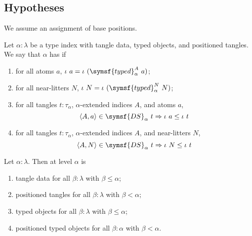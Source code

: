 \subsection{Hypotheses}

We assume an assignment of base positions.
\begin{definition}
    \label{def:PositionedTypedObjects}
    Let \( \alpha : \lambda \) be a type index with tangle data, typed objects, and positioned tangles.
    We say that \( \alpha \) has  if
    \begin{enumerate}
        \item for all atoms \( a \), \( \iota\ a = \iota\ (\symsf{typed}^A_\alpha\ a) \);
        \item for all near-litters \( N \), \( \iota\ N = \iota\ (\symsf{typed}^N_\alpha\ N) \);
        \item for all tangles \( t : \tau_\alpha \), \( \alpha \)-extended indices \( A \), and atoms \( a \),
        \[ \langle A, a \rangle \in \symsf{DS}_\alpha\ t \Rightarrow \iota\ a \leq \iota\ t \]
        \item for all tangles \( t : \tau_\alpha \), \( \alpha \)-extended indices \( A \), and near-litters \( N \),
        \[ \langle A, N \rangle \in \symsf{DS}_\alpha\ t \Rightarrow \iota\ N \leq \iota\ t \]
    \end{enumerate}
\end{definition}
\begin{definition}
    Let \( \alpha : \lambda \).
    Then  at level \( \alpha \) is
    \begin{enumerate}
        \item tangle data for all \( \beta : \lambda \) with \( \beta \leq \alpha \);
        \item positioned tangles for all \( \beta : \lambda \) with \( \beta < \alpha \);
        \item typed objects for all \( \beta : \lambda \) with \( \beta \leq \alpha \);
        \item positioned typed objects for all \( \beta : \alpha \) with \( \beta < \alpha \).
    \end{enumerate}
\end{definition}
